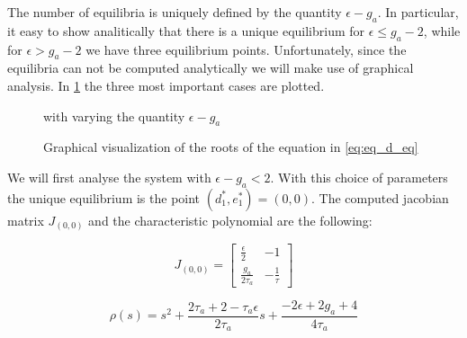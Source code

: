 The number of equilibria is uniquely defined by the quantity $\epsilon-g_a$. In particular, it easy to show analitically that there is a unique equilibrium for $\epsilon \leq g_a-2$, while for $\epsilon > g_a-2$ we have three equilibrium points. Unfortunately, since the equilibria can not be computed analytically we will make use of graphical analysis. In \cref{fig:eq2D_adapt} the three most important cases are plotted.

 \begin{figure}[!h]
        \caption{\label{fig:eq2D_adapt} Graphical visualization of the roots of the equation in \eqref{eq:eq_d_eq}} with varying the quantity $\epsilon - g_a$
\end{figure}

We will first analyse the system with $\epsilon - g_a <2$. With this choice of parameters the unique equilibrium is the point $(d_1^*,e_1^*)=(0, 0)$. The computed jacobian matrix $J_{(0,0)}$ and the characteristic polynomial are the following:

\begin{equation}
J_{(0, 0)} = \begin{bmatrix} 
\frac{\epsilon}{2} & -1 \\
\frac{g_a}{2\tau_a} & -\frac{1}{\tau}
\end{bmatrix}
\end{equation}

\begin{equation}
\rho(s) = s^2 +  \frac{2\tau_a + 2 - \tau_a \epsilon}{2\tau_a} s + \frac{-2\epsilon + 2g_a + 4}{4\tau_a}
\end{equation}

